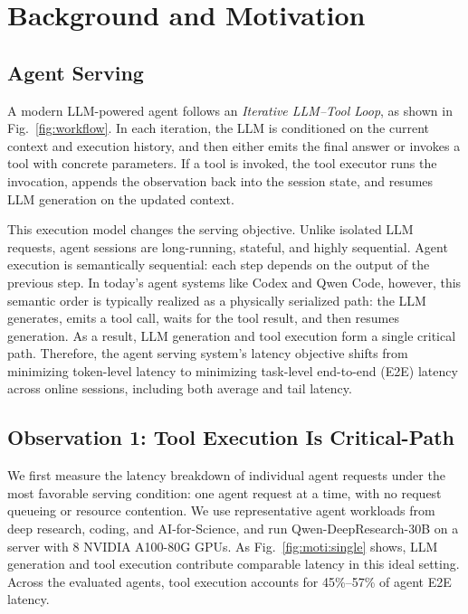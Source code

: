 \section{Background and Motivation}
\label{sec:moti}

\subsection{Agent Serving}

A modern LLM-powered agent follows an \emph{Iterative LLM--Tool Loop}, as shown in Fig.~\ref{fig:workflow}.
In each iteration, the LLM is conditioned on the current context and execution history, and then either emits the final answer or invokes a tool with concrete parameters.
If a tool is invoked, the tool executor runs the invocation, appends the observation back into the session state, and resumes LLM generation on the updated context.

This execution model changes the serving objective.
Unlike isolated LLM requests, agent sessions are long-running, stateful, and highly sequential.
Agent execution is semantically sequential: each step depends on the output of the previous step. In today's agent systems like Codex and Qwen Code, however, this semantic order is typically realized as a physically serialized path: the LLM generates, emits a tool call, waits for the tool result, and then resumes generation.
As a result, LLM generation and tool execution form a single critical path.
Therefore, the agent serving system's latency objective shifts from minimizing token-level latency to minimizing task-level end-to-end (E2E) latency across online sessions, including both average and tail latency.

\subsection{Observation 1: Tool Execution Is Critical-Path}
\label{sec:inefficiencies}

We first measure the latency breakdown of individual agent requests under the most favorable serving condition: one agent request at a time, with no request queueing or resource contention.
We use representative agent workloads from deep research, coding, and AI-for-Science, and run Qwen-DeepResearch-30B on a server with 8 NVIDIA A100-80G GPUs.
As Fig.~\ref{fig:moti:single} shows, LLM generation and tool execution contribute comparable latency in this ideal setting.
Across the evaluated agents, tool execution accounts for 45\%--57\% of agent E2E latency.

